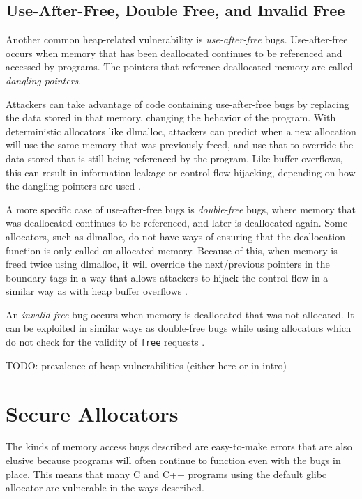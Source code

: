 \documentclass[conference]{IEEEtran}
\begin{document}
\subsection{Use-After-Free, Double Free, and Invalid Free}

Another common heap-related vulnerability is \emph{use-after-free} bugs.
Use-after-free occurs when memory that has been deallocated continues to be referenced and accessed by programs.
The pointers that reference deallocated memory are called \emph{dangling pointers}.

Attackers can take advantage of code containing use-after-free bugs by replacing the data stored in that memory, changing the behavior of the program.
With deterministic allocators like dlmalloc, attackers can predict when a new allocation will use the same memory that was previously freed, and use that to override the data stored that is still being referenced by the program.
Like buffer overflows, this can result in information leakage or control flow hijacking, depending on how the dangling pointers are used \cite{freeguard}.

A more specific case of use-after-free bugs is \emph{double-free} bugs, where memory that was deallocated continues to be referenced, and later is deallocated again.
Some allocators, such as dlmalloc, do not have ways of ensuring that the deallocation function is only called on allocated memory.
Because of this, when memory is freed twice using dlmalloc, it will override the next/previous pointers in the boundary tags in a way that allows attackers to hijack the control flow in a similar way as with heap buffer overflows \cite{security_mem_cpp}.

An \emph{invalid free} bug occurs when memory is deallocated that was not allocated.
It can be exploited in similar ways as double-free bugs while using allocators which do not check for the validity of \verb|free| requests \cite{freeguard}.

{\color{red} TODO: prevalence of heap vulnerabilities (either here or in intro) }

\section{Secure Allocators}

The kinds of memory access bugs described are easy-to-make errors that are also elusive because programs will often continue to function even with the bugs in place.
This means that many C and C++ programs using the default glibc allocator are vulnerable in the ways described.
\end{document}
